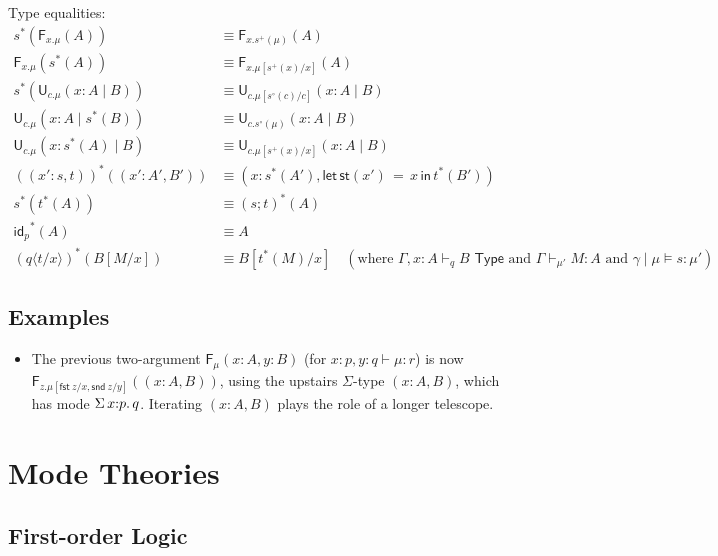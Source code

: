 \documentclass[10pt]{article}
\theoremstyle{definition}
\newcommand\dsd[1]{\ensuremath{\mathsf{#1}}}
\newcommand{\TYPE}{\,\,\mathsf{Type}}
\newcommand\F[2]{\ensuremath{\mathsf{F}_{#1}(#2)}}
\newcommand\U[3]{\ensuremath{\mathsf{U}_{#1}(#2 \mid #3)}}
\newcommand\St[2]{\ensuremath{{#1}^*(#2)}}
\newcommand\StI[1]{\ensuremath{\mathsf{st}(#1)}}
\newcommand\StE[3]{\ensuremath{\mathsf{let} \, \StI{#2} \, = \, {#1} \, \mathsf{in} \, #3}}
\newcommand\TermTwo[4]{\ensuremath{#1 \mid #3 \vDash #2 : #4}}
\newcommand\TrPlus[2]{\ensuremath{#1^+(#2)}}
\newcommand\TrCirc[2]{\ensuremath{#1^\circ(#2)}}
\newcommand{\id}{\mathsf{id}}
\newcommand\ap[2]{\ensuremath{#1 \langle #2 \rangle }}
\newcommand{\app}[2]{\ensuremath{#1 \: #2}}
\newcommand{\sigmacl}[3]{\ensuremath{\textnormal{$\Sigma$}\,#1{:}#2.\,#3}}
\newcommand{\fst}[1]{\app{\dsd{fst}}{#1}}
\newcommand{\snd}[1]{\app{\dsd{snd}}{#1}}
\newcommand{\telety}[3]{\ensuremath{(#1{:}#2,#3)}}
\begin{document}
Type equalities:
\begin{align*}
\St{s}{\F{x.\mu}{A}} &\equiv \F{x.\TrPlus{s}{\mu}}{A} \\
\F{x.\mu}{\St{s}{A}} &\equiv \F{x.\mu[\TrPlus{s}{x}/x]}{A} \\
\St{s}{\U{c.\mu}{x:A}{B}} &\equiv \U{c.\mu[\TrCirc{s}{c}/c]}{x:A}{B} \\
\U{c.\mu}{x:A}{\St{s}{B}} &\equiv \U{c.\TrCirc{s}{\mu}}{x:A}{B} \\
\U{c.\mu}{x:\St{s}{A}}{B} &\equiv \U{c.\mu[\TrPlus{s}{x}/x]}{x:A}{B} \\
\St{(\telety{x'}{s}{t})}{\telety{x'}{A'}{B'}} & \equiv \telety{x}{\St{s}{A'}}{\StE{x}{x'}{\St{t}{B'}}} \\
\St{s}{\St{t}{A}} &\equiv \St{(s;t)}{A} \\
\St{\id_p}{A} &\equiv A\\
\St{(\ap{q}{t/x})}{B[M/x]} & \equiv B[\St{t}{M}/x] \quad (\text{where }
\Gamma,x:A \vdash_q B \TYPE \text{ and } \Gamma \vdash_{\mu'} M : A \text{ and }
\TermTwo{\gamma}{s}{\mu}{\mu'})
\end{align*}

\subsection{Examples}

\begin{itemize}
\item 
The previous two-argument \F{\mu}{x:A,y:B} (for $x :p, y:q \vdash \mu :
r$) is now \F{z.\mu[\fst z/x,\snd z/y]}{\telety{x}{A}{B}}, using the
upstairs $\Sigma$-type ${\telety{x}{A}{B}}$, which has mode
$\sigmacl{x}{p}{q}$.  Iterating $\telety{x}{A}{B}$ plays the role of a
longer telescope.  
\end{itemize}

\section{Mode Theories}

\subsection{First-order Logic}
\end{document}
